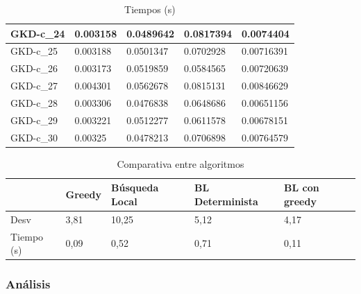 \documentclass[11pt,a4paper]{article}
\begin{document}
\begin{table}[H]
\begin{tabular}{l|l|l|l|l|}
			\multicolumn{1}{|l|}{GKD-c\_24} & 0.003158                    & 0.0489642                           & 0.0817394                            & 0.0074404                      \\ \hline
			\multicolumn{1}{|l|}{GKD-c\_25} & 0.003188                    & 0.0501347                           & 0.0702928                            & 0.00716391                     \\ \hline
			\multicolumn{1}{|l|}{GKD-c\_26} & 0.003173                    & 0.0519859                           & 0.0584565                            & 0.00720639                     \\ \hline
			\multicolumn{1}{|l|}{GKD-c\_27} & 0.004301                    & 0.0562678                           & 0.0815131                            & 0.00846629                     \\ \hline
			\multicolumn{1}{|l|}{GKD-c\_28} & 0.003306                    & 0.0476838                           & 0.0648686                            & 0.00651156                     \\ \hline
			\multicolumn{1}{|l|}{GKD-c\_29} & 0.003221                    & 0.0512277                           & 0.0611578                            & 0.00678151                     \\ \hline
			\multicolumn{1}{|l|}{GKD-c\_30} & 0.00325                     & 0.0478213                           & 0.0706898                            & 0.00764579                     \\ \hline
		\end{tabular}
		\caption{ Tiempos (s) }
		\label{tiempos}
	\end{table}

	\begin{table}[H]
		\begin{tabular}{l|l|l|l|l|}
			\cline{2-5}
			& Greedy & Búsqueda Local & BL Determinista & BL con greedy \\ \hline
			\multicolumn{1}{|l|}{Desv}       & 3,81   & 10,25          & 5,12            & 4,17          \\ \hline
			\multicolumn{1}{|l|}{Tiempo (s)} & 0,09   & 0,52           & 0,71            & 0,11          \\ \hline
		\end{tabular}
		\caption{ Comparativa entre algoritmos }
		\label{comparativa}
	\end{table}

	\subsubsection{ Análisis }
	
\end{document}
